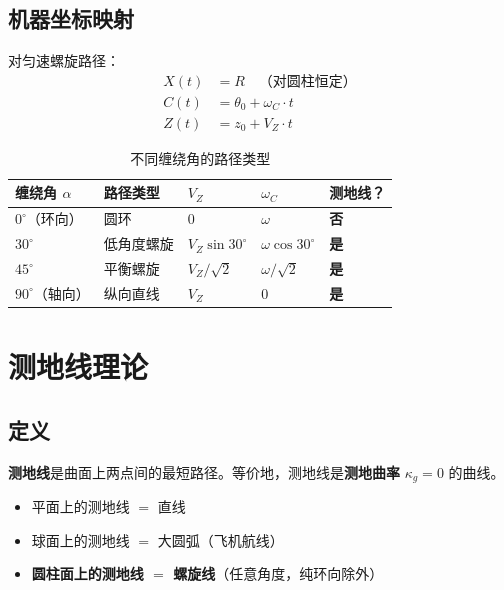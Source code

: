 \documentclass[11pt,a4paper]{article}
\begin{document}
\subsection{机器坐标映射}

对匀速螺旋路径：
\begin{align}
X(t) &= R \quad\text{（对圆柱恒定）} \\
C(t) &= \theta_0 + \omega_C \cdot t \\
Z(t) &= z_0 + V_Z \cdot t
\end{align}

\begin{table}[H]
\centering
\begin{tabular}{lllll}
\toprule
\textbf{缠绕角} $\alpha$ & \textbf{路径类型} & $V_Z$ & $\omega_C$ & \textbf{测地线？} \\
\midrule
$0^\circ$（环向） & 圆环 & $0$ & $\omega$ & \textcolor{fail}{\textbf{否}} \\
$30^\circ$ & 低角度螺旋 & $V_Z\sin 30^\circ$ & $\omega\cos 30^\circ$ & \textcolor{pass}{\textbf{是}} \\
$45^\circ$ & 平衡螺旋 & $V_Z/\sqrt{2}$ & $\omega/\sqrt{2}$ & \textcolor{pass}{\textbf{是}} \\
$90^\circ$（轴向） & 纵向直线 & $V_Z$ & $0$ & \textcolor{pass}{\textbf{是}} \\
\bottomrule
\end{tabular}
\caption{不同缠绕角的路径类型}
\end{table}


\section{测地线理论}

\subsection{定义}

\textbf{测地线}是曲面上两点间的最短路径。等价地，测地线是\textbf{测地曲率} $\kappa_g = 0$ 的曲线。

\begin{itemize}[nosep]
\item 平面上的测地线 $=$ 直线
\item 球面上的测地线 $=$ 大圆弧（飞机航线）
\item \textbf{圆柱面上的测地线 $=$ 螺旋线}（任意角度，纯环向除外）
\end{itemize}
\end{document}
